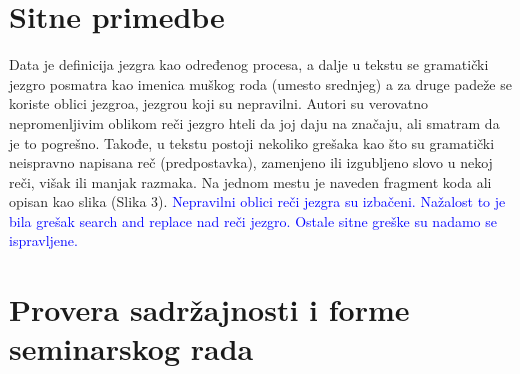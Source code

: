 \documentclass[a4paper]{report}
\newcommand{\odgovor}[1]{\textcolor{blue}{#1}}
\begin{document}
\section{Sitne primedbe}
Data je definicija jezgra kao određenog procesa, a dalje u tekstu se gramatički jezgro posmatra kao imenica muškog roda (umesto srednjeg) a za druge padeže se koriste oblici jezgroa, jezgrou koji su nepravilni. Autori su verovatno nepromenljivim oblikom reči jezgro hteli da joj daju na značaju, ali smatram da je to pogrešno. Takođe, u tekstu postoji nekoliko grešaka kao što su gramatički neispravno napisana reč (predpostavka), zamenjeno ili izgubljeno slovo u nekoj reči, višak ili manjak razmaka. Na jednom mestu je naveden fragment koda ali opisan kao slika (Slika 3).
\odgovor{
  Nepravilni oblici reči jezgra su izbačeni. Nažalost to je bila grešak search and replace nad reči jezgro.
  Ostale sitne greške su nadamo se ispravljene.
}

\section{Provera sadržajnosti i forme seminarskog rada}
\end{document}
